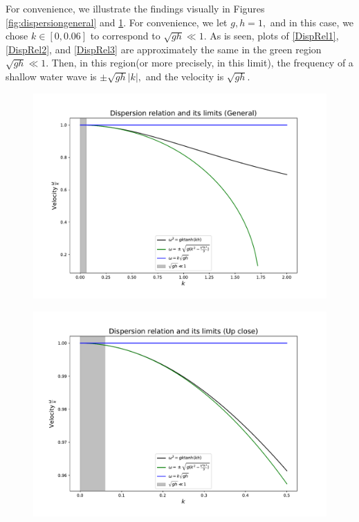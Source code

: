 \documentclass[10pt,reqno,oneside,a4paper]{article}
\begin{document}
For convenience, we illustrate the findings visually in Figures \ref{fig:dispersiongeneral} and \ref{fig:dispersionclose}. For convenience, we let $g , h = 1,$ and in this case, we chose $k \in [0, 0.06]$ to correspond to $\sqrt{gh} \ll 1.$ As is seen, plots of \eqref{DispRel1}, \eqref{DispRel2}, and \eqref{DispRel3} are approximately the same in the green region $\sqrt{gh} \ll 1.$ Then, in this region(or more precisely, in this limit), the frequency of a shallow water wave is $\pm\sqrt{gh} |k|,$ and the velocity is $\sqrt{gh}.$
\begin{figure}
\centering
\begin{minipage}{.5\textwidth}
  \centering
  \includegraphics[width=\linewidth]{Figures/Dispersion1.pdf}
  \label{fig:dispersiongeneral}
\end{minipage}%
\begin{minipage}{.5\textwidth}
  \centering
  \includegraphics[width=\linewidth]{Figures/Dispersion2.pdf}
  \label{fig:dispersionclose}
\end{minipage}
\end{figure}
\end{document}
